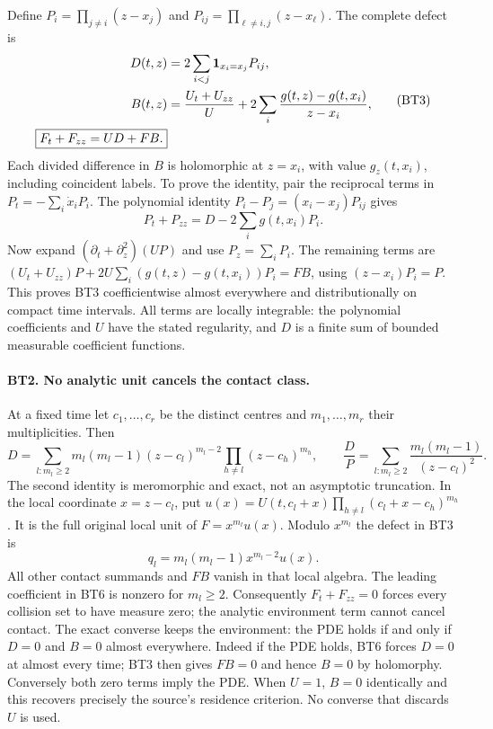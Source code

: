 Define $P_i=\prod_{j\ne i}(z-x_j)$ and
$P_{ij}=\prod_{\ell\ne i,j}(z-x_\ell)$. The complete defect is
\[
\begin{split}
 D(t,z)&=2\sum_{i<j}{\bf1}_{x_i=x_j}P_{ij},\\
 B(t,z)&=\frac{U_t+U_{zz}}{U}
       +2\sum_i\frac{g(t,z)-g(t,x_i)}{z-x_i},\\
 \boxed{F_t+F_{zz}=U D+F B.}
\end{split}\tag{BT3}
\]
Each divided difference in $B$ is holomorphic at $z=x_i$, with
value $g_z(t,x_i)$, including coincident labels.
To prove the identity, pair the reciprocal terms in
$P_t=-\sum_i\dot x_iP_i$. The polynomial identity
$P_i-P_j=(x_i-x_j)P_{ij}$ gives
\[
 P_t+P_{zz}=D-2\sum_i g(t,x_i)P_i.
 \tag{BT4}
\]
Now expand $(\partial_t+\partial_z^2)(UP)$ and use
$P_z=\sum_iP_i$. The remaining terms are
$(U_t+U_{zz})P+2U\sum_i(g(t,z)-g(t,x_i))P_i=FB$,
using $(z-x_i)P_i=P$. This proves BT3
coefficientwise almost everywhere and distributionally on compact
time intervals. All terms are locally integrable: the polynomial
coefficients and $U$ have the stated regularity, and $D$ is a finite
sum of bounded measurable coefficient functions.

\paragraph{BT2. No analytic unit cancels the contact class.}
At a fixed time let $c_1,\ldots,c_r$ be the distinct centres and
$m_1,\ldots,m_r$ their multiplicities. Then
\[
 D=\sum_{l:m_l\ge2}m_l(m_l-1)(z-c_l)^{m_l-2}
                  \prod_{h\ne l}(z-c_h)^{m_h},\qquad
 \frac DP=\sum_{l:m_l\ge2}\frac{m_l(m_l-1)}{(z-c_l)^2}.
 \tag{BT5}
\]
The second identity is meromorphic and exact, not an asymptotic
truncation. In the local coordinate $x=z-c_l$, put
$u(x)=U(t,c_l+x)\prod_{h\ne l}(c_l+x-c_h)^{m_h}$.
It is the full original local unit of $F=x^{m_l}u(x)$. Modulo
$x^{m_l}$ the defect in BT3 is
\[
 q_l=m_l(m_l-1)x^{m_l-2}u(x).
 \tag{BT6}
\]
All other contact summands and $FB$ vanish in that local algebra.
The leading coefficient in BT6 is nonzero for $m_l\ge2$.
Consequently $F_t+F_{zz}=0$ forces every collision set to have
measure zero; the analytic environment term cannot cancel contact.
The exact converse keeps the environment: the PDE holds if and only
if $D=0$ and $B=0$ almost everywhere. Indeed if the PDE holds, BT6
forces $D=0$ at almost every time; BT3 then gives $FB=0$ and hence
$B=0$ by holomorphy. Conversely both zero terms imply the PDE.
When $U=1$, $B=0$ identically and this recovers precisely the
source's residence criterion. No converse that discards $U$ is used.

